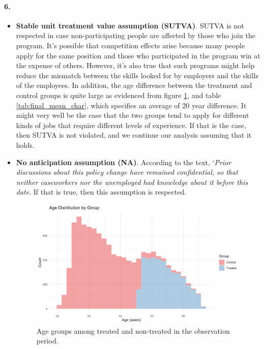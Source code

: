 \documentclass{scrartcl}
\begin{document}
\paragraph*{6.}

\begin{itemize}[label=$\blacktriangleright$]
    \item \textbf{Stable unit treatment value assumption (SUTVA)}. SUTVA is not respected in case non-participating people are affected by those who join the program. It's possible that competition effects arise because many people apply for the same position and those who participated in the program win at the expense of others. However, it's also true that such programs might help reduce the mismatch between the skills looked for by employers and the skills of the employees. In addition, the age difference between the treatment and control groups is quite large as evidenced from figure \ref{fig:age_hist}, and table \ref{tab:final_mean_char}, which specifies an average of 20 year difference. It might very well be the case that the two groups tend to apply for different kinds of jobs that require different levels of experience. If that is the case, then SUTVA is not violated, and we continue our analysis assuming that it holds.\

    \item \textbf{No anticipation assumption (NA)}. According to the text, `\textit{Prior discussions about this policy change have remained confidential, so that neither caseworkers nor the unemployed had knowledge about it before this date}. If that is true, then this assumption is respected. \

        \begin{figure}
            \centering
            \includegraphics[width=0.75\linewidth]{output/figures/final_histogram_age.jpg}
            \caption{Age groups among treated and non-treated in the observation period.}
            \label{fig:age_hist}
        \end{figure}


\end{itemize}
\end{document}
